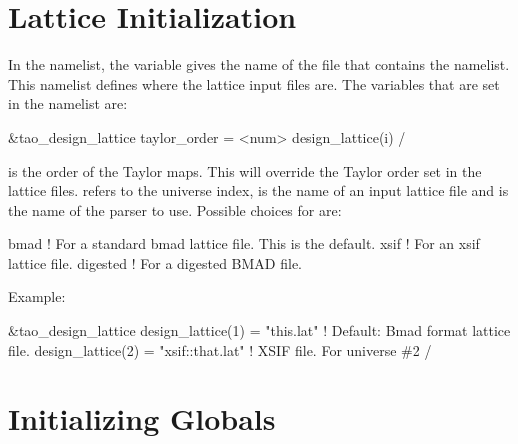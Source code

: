 {{%
\section{Lattice Initialization}
\label{s:init_lat} 

In the  namelist, the  variable gives
the name of the file that contains the 
namelist. This namelist defines where the lattice input files are. The
variables that are set in the  namelist are:
\begin{example}
  &tao_design_lattice
    taylor_order = <num>
    design_lattice(i)%
  /
\end{example}
 is the order of the Taylor maps. This will override
the Taylor order set in the lattice files.  refers to the
universe index,  is the name of an input lattice
file and  is the name of the parser to use. Possible
choices for  are:
\begin{example}
  bmad      ! For a standard bmad lattice file. This is the default.
  xsif      ! For an xsif lattice file.
  digested  ! For a digested BMAD file.
\end{example}

Example:
\begin{example}
  &tao_design_lattice
    design_lattice(1) = "this.lat"          ! Default: Bmad format lattice file.
    design_lattice(2) = "xsif::that.lat"    ! XSIF file. For universe \#2
  /
\end{example}

\section{Initializing Globals}
\label{s:globals} 

}}
